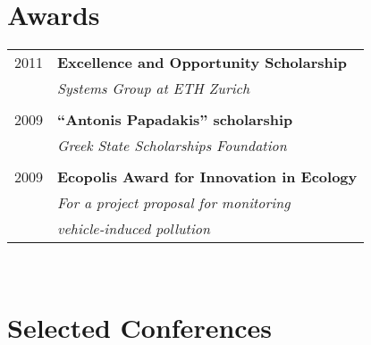\documentclass[10pt]{article} %
\begin{document}
\begin{minipage}[t]{0.44\textwidth}
\begin{tabular}{ll}
\end{tabular}




\section{Awards} 

\begin{tabular}{rl}
2011	 & \textbf{Excellence and Opportunity Scholarship}\\
& \textit{Systems Group at ETH Zurich}\\ \\


2009	 & \textbf{``Antonis Papadakis'' scholarship
}\\
& \textit{Greek State Scholarships
Foundation}\\ \\


2009	& \textbf{Ecopolis Award for Innovation in Ecology
}\\
& \textit{For a project proposal for monitoring}\\
& \textit{vehicle-induced pollution}\\

\end{tabular}\\[10pt]





\section{Selected Conferences} 


\end{minipage}
\end{document}
